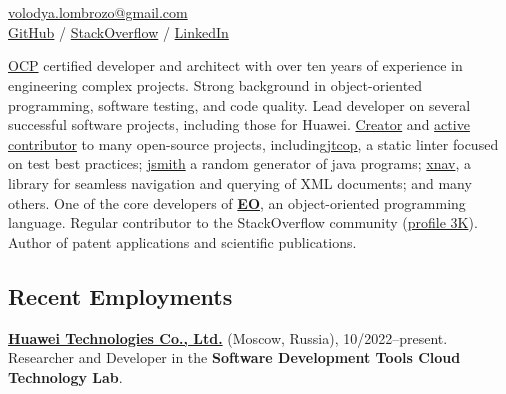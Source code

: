 \documentclass{vl}
\begin{document}
    \vlPrintPhoto{}

    \section*{\Large {}}

    \href{mailto:volodya.lombrozo@gmail.com}{volodya.lombrozo@gmail.com}\\%
    \href{https://github.com/volodya-lombrozo}{GitHub} /
    \href{https://stackoverflow.com/users/10423604/volodya-lombrozo}{StackOverflow} /
    \href{https://www.linkedin.com/in/vladimir-zakharov-lombrozo-b71744216/}{LinkedIn}

    \vspace*{12pt}

    \href{https://catalog-education.oracle.com/pls/certview/sharebadge?id=87F6A2FE819A5A5AF4120A05900AB28A461EE9A3EE9FBFA02721FADAEB3BCE19}{OCP}
    certified developer and architect with over ten years of experience in engineering complex projects.
    Strong background in object-oriented programming, software testing, and code quality.
    Lead developer on several successful software projects, including those for Huawei.
    \href{https://github.com/volodya-lombrozo?tab=repositories}{Creator} and
    \href{https://github.com/volodya-lombrozo}{active contributor} to many open-source projects,
    including\href{https://github.com/volodya-lombrozo/jtcop}{jtcop}, a static linter focused on test best practices;
    \href{https://github.com/volodya-lombrozo/jsmith}{jsmith} a random generator of java programs;
    \href{https://github.com/volodya-lombrozo/xnav}{xnav}, a library for seamless navigation and querying of XML
    documents; and many others.
    One of the core developers of \textbf{\href{https://www.eolang.org}{EO}}, an object-oriented programming language.
    Regular contributor to the StackOverflow community
    (\href{https://stackoverflow.com/users/10423604/volodya-lombrozo}{profile 3K}).
    Author of patent applications and scientific publications.

    \subsection*{Recent Employments}

    \textbf{\href{https://www.huawei.com}{Huawei Technologies Co., Ltd.}} (Moscow, Russia), 10/2022--present.
    Researcher and Developer in the \textbf{Software Development Tools Cloud Technology Lab}.
\end{document}
